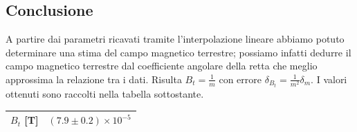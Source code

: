 \documentclass[a4paper]{article}
\begin{document}
\subsection{Conclusione}
A partire dai parametri ricavati tramite l'interpolazione lineare abbiamo potuto determinare una stima del campo magnetico terrestre;
possiamo infatti dedurre il campo magnetico terrestre dal coefficiente angolare della retta che meglio approssima la relazione tra i dati.
Risulta $B_t = \frac {1}{m}$ con errore $\delta_{B_t} = \frac {1}{m^2}\delta_m$.
I valori ottenuti sono raccolti nella tabella sottostante.

\begin{center}
\begin{tabular}{|l|c|}
\hline
$B_t$ [T] & $(7.9 \pm 0.2) \times 10^{-5}$ \\
\hline
\end{tabular}
\end{center}
\end{document}
